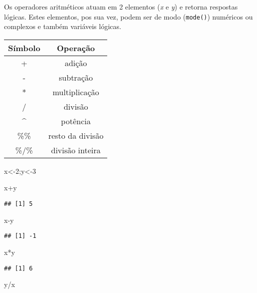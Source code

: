 \documentclass[
]{book}
\newenvironment{Shaded}{\begin{snugshade}}{\end{snugshade}}
\newcommand{\DecValTok}[1]{\textcolor[rgb]{0.00,0.00,0.81}{#1}}
\newcommand{\NormalTok}[1]{#1}
\newcommand{\OtherTok}[1]{\textcolor[rgb]{0.56,0.35,0.01}{#1}}
\newcommand{\SpecialCharTok}[1]{\textcolor[rgb]{0.00,0.00,0.00}{#1}}
\begin{document}
Os operadores aritméticos atuam em 2 elementos (\emph{x} e \emph{y}) e retorna respostas lógicas. Estes elementos, pos sua vez, podem ser de modo (\texttt{mode()}) numéricos ou complexos e também variáveis lógicas.

\begin{longtable}[]{@{}cc@{}}
\toprule
Símbolo & Operação \\
\midrule
\endhead
+ & adição \\
- & subtração \\
* & multiplicação \\
/ & divisão \\
\^{} & potência \\
\%\% & resto da divisão \\
\%/\% & divisão inteira \\
\bottomrule
\end{longtable}

\begin{Shaded}
\begin{Highlighting}[]
\NormalTok{x}\OtherTok{\textless{}{-}}\DecValTok{2}\NormalTok{;y}\OtherTok{\textless{}{-}}\DecValTok{3}

\NormalTok{x}\SpecialCharTok{+}\NormalTok{y}
\end{Highlighting}
\end{Shaded}

\begin{verbatim}
## [1] 5
\end{verbatim}

\begin{Shaded}
\begin{Highlighting}[]
\NormalTok{x}\SpecialCharTok{{-}}\NormalTok{y}
\end{Highlighting}
\end{Shaded}

\begin{verbatim}
## [1] -1
\end{verbatim}

\begin{Shaded}
\begin{Highlighting}[]
\NormalTok{x}\SpecialCharTok{*}\NormalTok{y}
\end{Highlighting}
\end{Shaded}

\begin{verbatim}
## [1] 6
\end{verbatim}

\begin{Shaded}
\begin{Highlighting}[]
\NormalTok{y}\SpecialCharTok{/}\NormalTok{x}
\end{Highlighting}
\end{Shaded}
\end{document}
